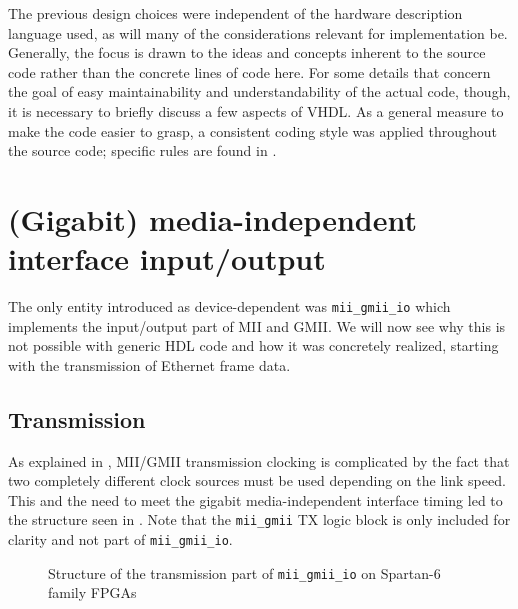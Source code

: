 \documentclass[a4paper, 11pt, oneside]{Thesis}  %
\begin{document}
The previous design choices were independent of the hardware description language used, as will many of the considerations relevant for implementation be. Generally, the focus is drawn to the ideas and concepts inherent to the source code rather than the concrete lines of code here. For some details that concern the goal of easy maintainability and understandability of the actual code, though, it is necessary to briefly discuss a few aspects of VHDL. As a general measure to make the code easier to grasp, a consistent coding style was applied throughout the source code; specific rules are found in . 

\section{(Gigabit) media-independent interface input/output}\label{ch:mii_io}

The only entity introduced as device-dependent was \texttt{mii\_gmii\_io} which implements the input/output part of MII and GMII. We will now see why this is not possible with generic HDL code and how it was concretely realized, starting with the transmission of Ethernet frame data.

\subsection{Transmission}\label{ch:mii_io_tx}

As explained in , MII/GMII transmission clocking is complicated by the fact that two completely different clock sources must be used depending on the link speed. This and the need to meet the gigabit media-independent interface timing led to the structure seen in . Note that the \texttt{mii\_gmii} TX logic block is only included for clarity and not part of \texttt{mii\_gmii\_io}.

\begin{figure}
\centering

\caption[Structure of the transmission part of mii\_gmii\_io on Spartan-6 family FPGAs]{Structure of the transmission part of \texttt{mii\_gmii\_io} on Spartan-6 family FPGAs}
\label{fig:mii_gmii_tx}
\end{figure}
\end{document}
